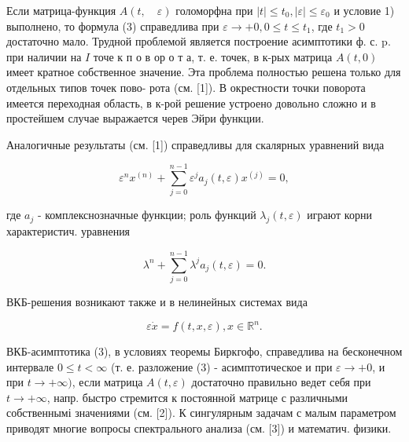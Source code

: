 \documentclass[10pt]{article}
\begin{document}
Если матрица-функция $A(t, \quad \varepsilon)$ голоморфна при $|t| \leqslant t_{0},|\varepsilon| \leqslant \varepsilon_{0}$ и условие 1) выполнено, то формула (3) справедлива при $\varepsilon \rightarrow+0,0 \leqslant t \leqslant t_{1}$, где $t_{1}>0$ достаточно мало. Трудной проблемой является построение асимптотики ф. с. p. при наличии на $I$ точе к п о в ор о т а, т. е. точек, в к-рых матрица $A(t, 0)$ имеет кратное собственное значение. Эта проблема полностью решена только для отдельных типов точек пово- рота (см. [1]). В окрестности точки поворота имеется переходная область, в к-рой решение устроено довольно сложно и в простейшем случае выражается черев Эйри функции.



Аналогичные результаты (см. [1]) справедливы для скалярных уравнений вида



\[

\varepsilon^{n} x^{(n)}+\sum_{j=0}^{n-1} \varepsilon^{j} a_{j}(t, \varepsilon) x^{(j)}=0,

\]



где $a_{j}$ - комплекснозначные функции; роль функций $\lambda_{j}(t, \varepsilon)$ играют корни характеристич. уравнения



\[

\lambda^{n}+\sum_{j=0}^{n-1} \lambda^{j} a_{j}(t, \varepsilon)=0 .

\]



ВКБ-решения возникают также и в нелинейных системах вида



\[

\varepsilon \dot{x}=f(t, x, \varepsilon), x \in \mathbb{R}^{n} .

\]



ВКБ-асимптотика (3), в условиях теоремы Биркгофо, справедлива на бесконечном интервале $0 \leqslant t<\infty$ (т. е. разложение (3) - асимптотическое и при $\varepsilon \rightarrow+0$, и при $t \rightarrow+\infty)$, если матрица $A(t, \varepsilon)$ достаточно правильно ведет себя при $t \rightarrow+\infty$, напр. быстро стремится к постоянной матрице с различными собственнымі значениями (см. [2]). К сингулярным задачам с малым параметром приводят многие вопросы спектрального анализа (см. [3]) и математич. физики.
\end{document}

